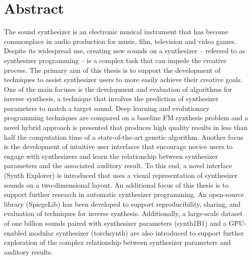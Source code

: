 \newpage
{}

\chapter*{Abstract}
The sound synthesizer is an electronic musical instrument that has become commonplace in audio production for music, film, television and video games. Despite its widespread use, creating new sounds on a synthesizer -- referred to as synthesizer programming -- is a complex task that can impede the creative process. The primary aim of this thesis is to support the development of techniques to assist synthesizer users to more easily achieve their creative goals. One of the main focuses is the development and evaluation of algorithms for inverse synthesis, a technique that involves the prediction of synthesizer parameters to match a target sound. Deep learning and evolutionary programming techniques are compared on a baseline FM synthesis problem and a novel hybrid approach is presented that produces high quality results in less than half the computation time of a state-of-the-art genetic algorithm. Another focus is the development of intuitive user interfaces that encourage novice users to engage with synthesizers and learn the relationship between synthesizer parameters and the associated auditory result. To this end, a novel interface (Synth Explorer) is introduced that uses a visual representation of synthesizer sounds on a two-dimensional layout. An additional focus of this thesis is to support further research in automatic synthesizer programming. An open-source library (SpiegeLib) has been developed to support reproducibility, sharing, and evaluation of techniques for inverse synthesis. Additionally, a large-scale dataset of one billion sounds paired with synthesizer parameters (synth1B1) and a GPU-enabled modular synthesizer (torchsynth) are also introduced to support further exploration of the complex relationship between synthesizer parameters and auditory results.






